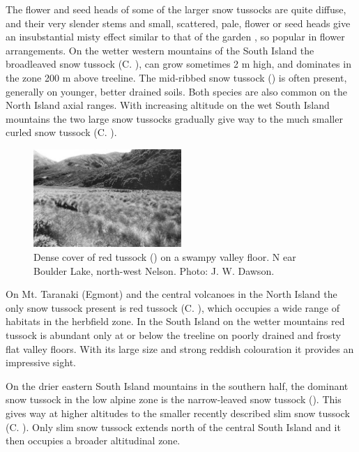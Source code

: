 The flower and seed heads of some of the larger snow tussocks are quite diffuse, and their very slender stems and small, scattered, pale, flower or seed heads give an insubstantial misty effect similar to that of the garden , so popular in flower arrangements.
On the wetter western mountains of the South Island the broadleaved snow tussock (C. ), can grow sometimes 2 m high, and dominates in the zone 200 m above treeline.
The mid-ribbed snow tussock () is often present, generally on younger, better drained soils.
Both species are also common on the North Island axial ranges.
With increasing altitude on the wet South Island mountains the two large snow tussocks gradually give way to the much smaller curled snow tussock (C. ).

\begin{figure}
	\includegraphics[width=0.5\textwidth]{graphics/figure97red-tussock.jpg}
	\centering
	\caption[Red tussock]{Dense cover of red tussock () on a swampy valley floor.
N   ear Boulder Lake, north-west Nelson.
	Photo: J. W. Dawson.}%
	\label{fig:97red-tussock}
\end{figure}

On Mt. Taranaki (Egmont) and the central volcanoes in the North Island the only snow tussock present is red tussock (C. ), which occupies a wide range of habitats in the herbfield zone.
In the South Island on the wetter mountains red tussock is abundant only at or below the treeline on poorly drained and frosty flat valley floors.
With its large size and strong reddish colouration it provides an impressive sight.

On the drier eastern South Island mountains in the southern half, the dominant snow tussock in the low alpine zone is the narrow-leaved snow tussock ().
This gives way at higher altitudes to the smaller recently described slim snow tussock (C. ).
Only slim snow tussock extends north of the central South Island and it then occupies a broader altitudinal zone.

